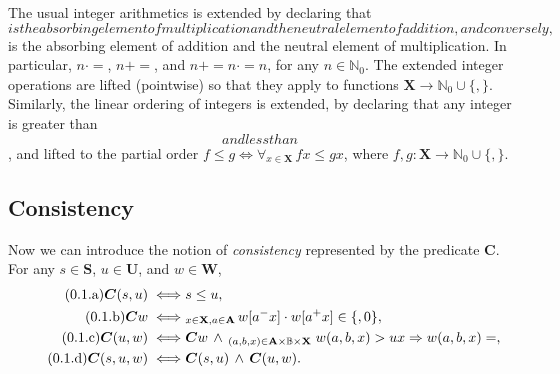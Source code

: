 \documentclass [a4paper,12pt] {article}
\theoremstyle{definition}
\renewcommand{\theequation}{\arabic{section}.\arabic{equation}}
\newcommand{\Forall}{}
\DeclareRobustCommand{\Forall}{\mathop{\mathlarger{\forall}}}
\newcommand{\xbot}{}
\DeclareRobustCommand{\xbot}{\mathop{\textstyle\mathsmaller{\bm\bot}}}
\newcommand{\xtop}{}
\DeclareRobustCommand{\xtop}{\mathop{\textstyle\mathsmaller{\bm\top}}}
\begin{document}
The usual integer arithmetics is extended by declaring that $\xbot$ is
the absorbing element of multiplication and the neutral element of
addition, and conversely, $\xtop$ is the absorbing element of addition
and the neutral element of multiplication.  In particular, $n \cdot
\xbot = \xbot$, $n + \xtop = \xtop$, and $n + \xbot = n \cdot \xtop =
n$, for any $n \in \mathbb {N}_0$.  The extended integer operations
are lifted (pointwise) so that they apply to functions $\mathbf {X}
\rightarrow \mathbb {N}_0 \cup \{\xbot, \xtop\}$.  Similarly, the
linear ordering of integers is extended, by declaring that any integer
is greater than $\xbot$ and less than $\xtop$, and lifted to the
partial order $f \leq g \iff \forall_{x \in \mathbf {X}}\,fx \leq gx$,
where $f, g\!: \mathbf {X} \rightarrow \mathbb {N}_0 \cup \{\xbot,
\xtop\}$.

\subsection {Consistency}

Now we can introduce the notion of {\em consistency}\/ represented by
the predicate $\bm {C}$.  For any $s \in \mathbf {S}$, $u \in \mathbf
{U}$, and $w \in \mathbf {W}$,
\begin {align}\label{eq:static-consistency}\stepcounter{equation}
  \tag{\theequation.a}
  \bm {C}(s, u) \iff &s \leq u,\\
  \tag{\theequation.b}
  \bm {C}w \iff &\Forall_{x \in \mathbf {X}, a \in \mathbf {A}}\,w[a^-x] \cdot w[a^+x] \in \{\xbot, 0\},\\
  \tag{\theequation.c}
  \bm {C}(u, w) \iff &\bm {C}w \,\land\, \Forall_{(a, b, x) \in \mathbf {A} \times \mathbb {B} \times \mathbf {X} }\;%
  w(a,b,x) > ux \Rightarrow w(a,b,x) = \xtop,\\
  \tag{\theequation.d}
  \bm {C}(s, u, w) \iff &\bm {C}(s, u) \,\land\, \bm {C}(u, w).
\end {align}
\end{document}
